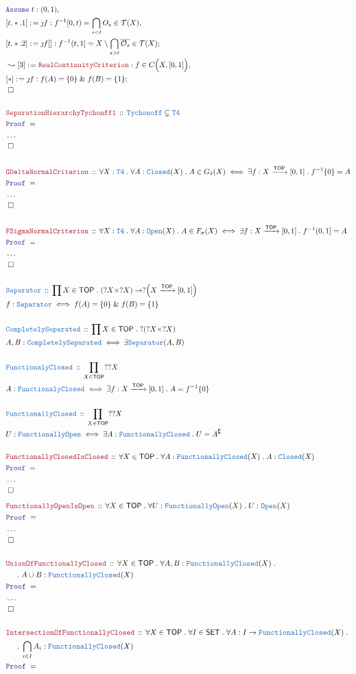 \documentclass[12pt]{scrartcl}
\newcommand{\TYPE}[1]{\textcolor{NavyBlue}{\mathtt{#1}}}
\newcommand{\LOGIC}[1]{\textcolor{Blue}{\mathtt{#1}}}
\newcommand{\THM}[1]{\textcolor{Maroon}{\mathtt{#1}}}
\renewcommand{\.}{\; . \;}
\newcommand{\de}{: \kern 0.1pc =}
\newcommand{\Theorem}[2]{& \THM{#1} \, :: \, #2 \\ & \Proof = \\ }
\newcommand{\DeclareType}[2]{& \TYPE{#1} \, :: \, #2 \\}
\newcommand{\DefineType}[3]{& #1 : \TYPE{#2} \iff #3 \\}
\newcommand{\NewLine}{\\ & \kern 1pc}
\newcommand{\Page}[1]{ \begin{align*} #1 \end{align*}   }
\newcommand{\NoProof}{ & \ldots \\ \EndProof}
\renewcommand{\And}{\; \& \;}
\newcommand{\Arrow}{\xrightarrow}
\renewcommand{\c}{\complement}
\newcommand{\Say}[3]{& #1 \de #2 : #3, \\}
\newcommand{\Conclude}[3]{& #1 \de #2 : #3; \\}
\newcommand{\Derive}[3]{& \leadsto #1 \de #2 : #3, \\}
\newcommand{\Assume}[2]{& \LOGIC{Assume} \; #1 : #2, \\}
\newcommand{\QED}{\; \square}
\newcommand{\EndProof}{& \QED \\}
\newcommand{\ByConstr}{\jmath}
\newcommand{\Proof}{\LOGIC{Proof} \; }
\newcommand{\SET}{\mathsf{SET}}
\newcommand{\TOP}{\mathsf{TOP}}
\newcommand{\T}{\mathcal{T}}
\renewcommand{\O}{\mathcal{O}}
\begin{document}
\Page{
	\Assume{t}{(0,1)}
	\Say{[t.*.1]}{ \ByConstr f  }{f^{-1}[0,t) = \bigcap_{s < t} O_s \in \T(X)     } 
	\Conclude{[t.*.2]}{\ByConstr f [] }{f^{-1}(t,1]  = X \setminus \bigcap_{s > t}  \overline{\O_s} \in \T(X) }  
	\Derive{[3]}{\THM{RealContinuityCriterion}}
	{
		f \in C\Big( X, [0,1]  \Big)
	}
	\Conclude{[*]}{\ByConstr f}{ f(A) = \{0\} \And f(B) = \{1\}}
	\EndProof
	\\
	\Theorem{SeparationHierarchyTychonff1}
	{
		\TYPE{Tychonoff} \subsetneq \TYPE{T4}
	}
	\NoProof
	\\
	\Theorem{GDeltaNormalCriterion}
	{
		\forall X : \TYPE{T4} \.
		\forall A : \TYPE{Closed}(X) \.  
		A \in G_\delta(X)
		\iff
		\exists f : X \Arrow{\TOP} [0,1] \. 
		f^{-1}\{0\} = A
	}
	\NoProof
	\\
	\Theorem{FSigmaNormalCriterion}
	{
		\forall X : \TYPE{T4} \.
		\forall A : \TYPE{Open}(X) \.  
		A \in F_\sigma(X)
		\iff
		\exists f : X \Arrow{\TOP} [0,1] \. 
		f^{-1}(0,1]  = A
	}
	\NoProof
	\\
	\DeclareType{Separator}
	{
		\prod X \in \TOP \.
		(?X \times ?X) \to ?\Big(X \Arrow{\TOP} [0,1]\Big)
	}
	\DefineType{f}{Separator}
	{
		f(A) = \{0\} \And f(B) = \{1\}	
	}
	\\
	\DeclareType{CompletelySeparated}
	{
		\prod X \in \TOP \.
		?(?X \times ?X)
	}
	\DefineType{A,B}{CompletelySeparated}
	{
		\exists \TYPE{Separator}(A,B)
	}
	\\
	\DeclareType{FunctionalyClosed}
	{
		\prod_{X \in \TOP} ??X
	}
	\DefineType{A}{FunctionalyClosed}
	{
		\exists f : X \Arrow{\TOP} [0,1] \. A = f^{-1}\{0\}
	}
	\\
	\DeclareType{FunctionallyClosed}
	{
		\prod_{X \in \TOP} ??X
	}
	\DefineType{U}{FunctionallyOpen}
	{
		\exists  A : \TYPE{FunctionallyClosed} \. U = A^\c
	}
	\\
	\Theorem{FunctionallyClosedIsClosed}
	{
		\forall X \in \TOP \. 
		\forall A : \TYPE{FunctionallyClosed}(X) \.
		A : \TYPE{Closed}(X) 
	}
	\NoProof
}\Page{
	\Theorem{FunctionallyOpenIsOpen}
	{
		\forall X \in \TOP \. 
		\forall U : \TYPE{FunctionallyOpen}(X) \.
		U : \TYPE{Open}(X) 
	}
	\NoProof
	\\
	\Theorem{UnionOfFunctionallyClosed}
	{
		\forall X \in \TOP \.
		\forall A,B : \TYPE{FunctionallyClosed}(X) \.
		\NewLine \. 
		A \cup B : \TYPE{FunctionallyClosed}(X)
	}
	\NoProof
	\\
	\Theorem{IntersectionOfFunctionallyClosed}
	{
		\forall X \in \TOP \.
		\forall I \in \SET \.
		\forall A : I \to \TYPE{FunctionallyClosed}(X) \.
		\NewLine \. 
		\bigcap_{i \in I} A_i : \TYPE{FunctionallyClosed}(X)
}}
\end{document}
